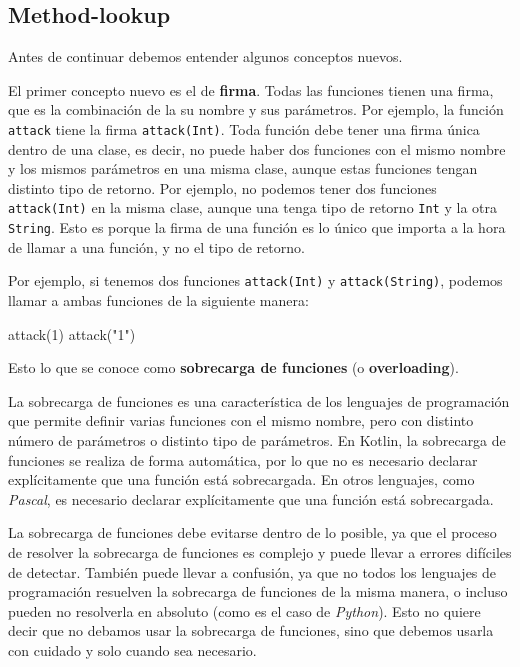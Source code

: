 \subsection{Method-lookup}
  Antes de continuar debemos entender algunos conceptos nuevos.

  El primer concepto nuevo es el de \textbf{firma}.
  Todas las funciones tienen una firma, que es la combinación de la su nombre y sus parámetros.
  Por ejemplo, la función \texttt{attack} tiene la firma \texttt{attack(Int)}.
  Toda función debe tener una firma única dentro de una clase, es decir, no puede haber dos 
  funciones con el mismo nombre y los mismos parámetros en una misma clase, aunque estas funciones 
  tengan distinto tipo de retorno.
  Por ejemplo, no podemos tener dos funciones \texttt{attack(Int)} en la misma clase, aunque una
  tenga tipo de retorno \texttt{Int} y la otra \texttt{String}.
  Esto es porque la firma de una función es lo único que importa a la hora de llamar a una función,
  y no el tipo de retorno.

  Por ejemplo, si tenemos dos funciones \texttt{attack(Int)} y \texttt{attack(String)}, podemos
  llamar a ambas funciones de la siguiente manera:
  
  \begin{kotlin}
    attack(1)
    attack("1")
  \end{kotlin}

  Esto lo que se conoce como \textbf{sobrecarga de funciones} (o 
  \textbf{overloading}).

  \begin{defaultbox}
    La sobrecarga de funciones es una característica de los lenguajes de programación que permite
    definir varias funciones con el mismo nombre, pero con distinto número de parámetros o distinto
    tipo de parámetros.
    En Kotlin, la sobrecarga de funciones se realiza de forma automática, por lo que no es necesario
    declarar explícitamente que una función está sobrecargada.
    En otros lenguajes, como \textit{Pascal}, es necesario declarar explícitamente que una función
    está sobrecargada.
  \end{defaultbox}

  La sobrecarga de funciones debe evitarse dentro de lo posible, ya que el proceso de resolver la
  sobrecarga de funciones es complejo\autocite{OverloadResolutionKotlin} y puede llevar a errores 
  difíciles de detectar.
  También puede llevar a confusión, ya que no todos los lenguajes de programación resuelven la
  sobrecarga de funciones de la misma manera, o incluso pueden no resolverla en absoluto (como es el
  caso de \textit{Python}).
  Esto no quiere decir que no debamos usar la sobrecarga de funciones, sino que debemos usarla con
  cuidado y solo cuando sea necesario.

